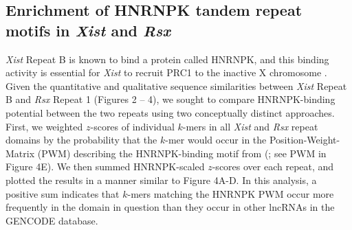 \subsection{Enrichment of HNRNPK tandem repeat motifs in \emph{Xist} and \emph{Rsx}}
\emph{Xist} Repeat B is known to bind a protein called HNRNPK, and this binding activity is essential for \emph{Xist} to recruit PRC1 to the inactive X chromosome \cite{Pintacuda2017HnRNPKSilencing}. Given the quantitative and qualitative sequence similarities between \emph{Xist} Repeat B and \emph{Rsx} Repeat 1 (Figures 2 – 4), we sought to compare HNRNPK-binding potential between the two repeats using two conceptually distinct approaches. First, we weighted $z$-scores of individual $k$-mers in all \emph{Xist} and \emph{Rsx} repeat domains by the probability that the $k$-mer would occur in the Position-Weight-Matrix (PWM) describing the HNRNPK-binding motif from (\cite{Ray2013ARegulation}; see PWM in Figure 4E). We then summed HNRNPK-scaled $z$-scores over each repeat, and plotted the results in a manner similar to Figure 4A-D. In this analysis, a positive sum indicates that $k$-mers matching the HNRNPK PWM occur more frequently in the domain in question than they occur in other lncRNAs in the GENCODE database.

